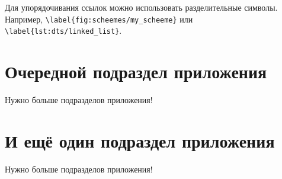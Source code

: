 \begin{table}[htbp]
    \captionsetup{justification=centering}
\end{table}


Для упорядочивания ссылок можно использовать разделительные символы.
Например, \verb+\label{fig:scheemes/my_scheeme}+ или \\ \verb+\label{lst:dts/linked_list}+.

\section{Очередной подраздел приложения}\label{app:B5}

Нужно больше подразделов приложения!

\section{И ещё один подраздел приложения}\label{app:B6}

Нужно больше подразделов приложения!

\clearpage
{}


